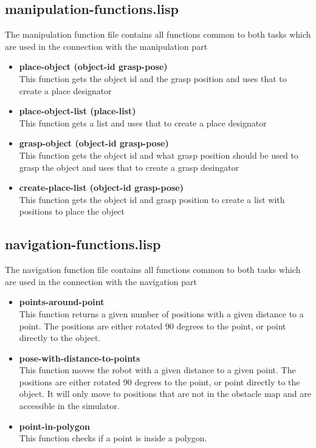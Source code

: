 \documentclass[main.tex]{subfiles}
\begin{document}
	    \subsection{manipulation-functions.lisp}
	    \label{manipulation}
	    The manipulation function file contains all functions common to both tasks which are used in the connection with the manipulation part
	    \begin{itemize}
	    \item \textbf{place-object (object-id grasp-pose)} \\
	    This function gets the object id and the grasp position and uses that to create a place designator  
		\item \textbf{place-object-list (place-list)} \\
		This function gets a list and uses that to create a place designator 
	    \item \textbf{grasp-object (object-id grasp-pose)} \\
	    This function gets the object id and what grasp position should be used to grasp the object and uses that to create a grasp desingator
	    \item \textbf{create-place-list (object-id grasp-pose)} \\
	    This function gets the object id and grasp position to create a list with positions to place the object
		\end{itemize}
	    \subsection{navigation-functions.lisp}
	    The navigation function file contains all functions common to both tasks which are used in the connection with the navigation part
	    \begin{itemize}
	    	\item \textbf{points-around-point} \\
	    	This function returns a given number of positions with a given 	distance to a point. The positions are either rotated 90 degrees to the point, or point directly to the object.
	    	\item \textbf{pose-with-distance-to-points} \\
	    	This function moves the robot with a given distance to a given point. The positions are either rotated 90 degrees to the point, or point directly to the object. It will only move to positions that are not in the obstacle map and are accessible in the simulator.
	    	\item \textbf{point-in-polygon} \\
			This function checks if a point is inside a polygon.
	    \end{itemize}
\end{document}

